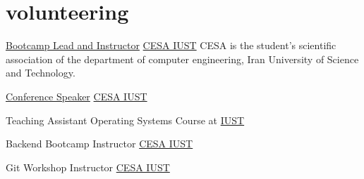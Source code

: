 \documentclass[a4paper,20pt]{article}
\begin{document}
\begin{minipage}[t]{0.3\textwidth}
  \section{volunteering}
  {

     \volunteer
     {\href{https://www.linkedin.com/posts/cesa-iust_قراره-با-هم-دنیای-وب-رو-زیر-و-رو-کنیم-activity-7221917118215180288-SRca/?rcm=ACoAACBgw1ABKvTqrlXwvAbFBul6vPHXEMeIFWw}{Bootcamp Lead and Instructor}}
      {\href{https://www.linkedin.com/company/cesa-iust/}{CESA IUST}}
      {CESA is the student's scientific association of the department of computer engineering, Iran University of Science and Technology.}
    
      \vspace*{6pt}

     \volunteer
      {\href{https://www.linkedin.com/posts/sina-shabaniku_techroad-activity-7201269217688436736-C0G2?utm_source=share&utm_medium=member_desktop&rcm=ACoAACBgw1ABKvTqrlXwvAbFBul6vPHXEMeIFWw}{Conference Speaker}}
      {\href{https://www.linkedin.com/company/cesa-iust/}{CESA IUST}}
      {}

    \vspace*{6pt}

    \volunteer
      {Teaching Assistant}
      {Operating Systems Course at \href{https://www.linkedin.com/school/iran-university-of-science-and-technology/}{IUST}}
      {}

    \vspace*{6pt}

    \volunteer
      {Backend Bootcamp Instructor}
      {\href{https://www.linkedin.com/company/cesa-iust/}{CESA IUST}}
      {}

    \vspace*{6pt}

    \volunteer
      {Git Workshop Instructor}
      {\href{https://www.linkedin.com/company/cesa-iust/}{CESA IUST}}
      {}
  }
\end{minipage}
\hspace{20pt}
\end{document}

